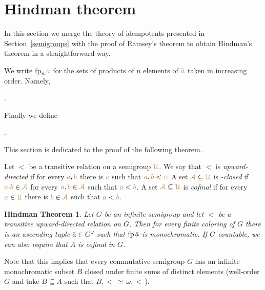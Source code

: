 \documentclass[creche.tex]{subfiles}
\begin{document}
\section{Hindman theorem}\label{Hindman}


\def\dotgt{\ooalign{$>$\cr$\cdot$\cr}}
\def\dotlt{\ooalign{$\kern1ex\cdot$\cr$<$\cr}}
\def\dotcl{ {\rm cl}^{\hbox{\scriptsize\dotlt}} }

In this section we merge the theory of idempotents presented in Section~\ref{semigroups}
with the proof of Ramsey's theorem to obtain Hindman's theorem in a straightforward way. 


We write ${\rm fp}_n\,{\color{brown}\bar a}$ for the sets of products of $n$ elements of ${\color{brown}\bar a}$ taken in increasing order.
Namely,

.

Finally we define

.

This section is dedicated to the proof of the following theorem.


Let $<$ be a transitive relation on a semigroup ${\color{brown}\EuScript U}$.
We say that $<$ is \emph{upward-directed\/} 
if for every ${\color{brown} a},{\color{brown} b}$ there is ${\color{brown} c}$ such that ${\color{brown} a},{\color{brown} b}<{\color{brown} c}$. 
A set ${\color{brown}{\EuScript A}}\subseteq{\color{brown}\EuScript U}$ is \emph{\dotlt-closed\/} 
if ${\color{brown} a}{\cdot}{\color{brown} b}\in{\color{brown}{\EuScript A}}$ 
for every ${\color{brown} a},{\color{brown} b}\in{\color{brown}{\EuScript A}}$ such that ${\color{brown} a}<{\color{brown} b}$.
A set ${\color{brown}{\EuScript A}}\subseteq{\color{brown}\EuScript U}$ is \emph{cofinal\/} 
if for every ${\color{brown} a}\in{\color{brown}\EuScript U}$ there is ${\color{brown} b}\in{\color{brown}{\EuScript A}}$ such that ${\color{brown} a}<{\color{brown} b}$. 

\theoremstyle{mio}
\newtheorem{Hindman}[thm]{Hindman Theorem}
\begin{Hindman}\label{thm_Hindman}
Let $G$ be an infinite semigroup and 
let $<$ be a transitive upward-directed relation on $G$.
Then for every finite coloring of $G$ 
there is an ascending tuple $\bar a\in G^\omega$ such that ${\rm fp}\,\bar a$ is monochromatic.
If $G$ countable, we can also require that $A$ is cofinal in $G$.
\end{Hindman}

Note that this implies that every commutative semigroup $G$ has an infinite monochromatic subset $B$ closed under finite sums of distinct elements (well-order $G$ and take $B\subseteq A$ such that $B,<\,\simeq\,\omega,<\,$).
\end{document}
